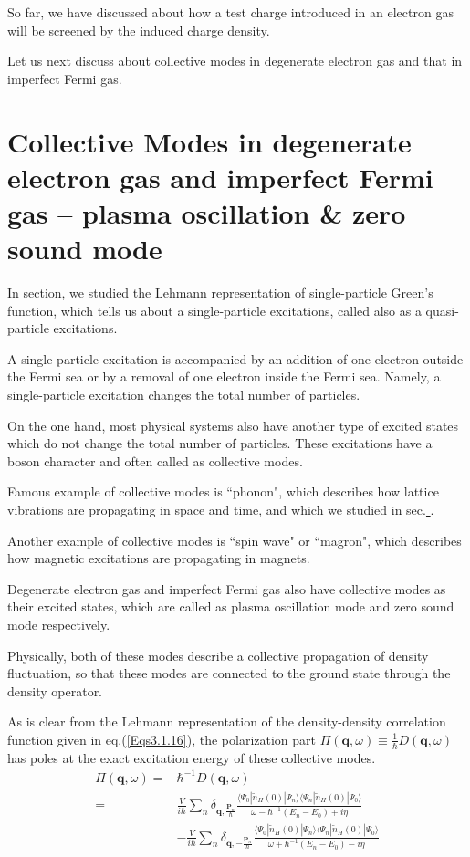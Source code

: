 So far, we have discussed about how a test charge introduced in an electron gas will be screened by the induced charge density.

Let us next discuss about collective modes in degenerate electron gas and that in imperfect Fermi gas.

\section{Collective Modes in degenerate electron gas and imperfect Fermi gas -- plasma oscillation \& zero sound mode}

In section, we studied the Lehmann representation of single-particle Green's function, which tells us about a single-particle excitations, called also as a quasi-particle excitations.

A single-particle excitation is accompanied by an addition of one electron outside the Fermi sea or by a removal of one electron inside the Fermi sea. Namely, a single-particle excitation changes the total number of particles.

On the one hand, most physical systems also have another type of excited states which do not change the total number of particles. These excitations have a boson character and often called as collective modes.

Famous example of collective modes is ``phonon", which describes how lattice vibrations are propagating in space and time, and which we studied in sec.\underline{    }.

Another example of collective modes is ``spin wave" or ``magron", which describes how magnetic excitations are propagating in magnets.

Degenerate electron gas and imperfect Fermi gas also have collective modes as their excited states, which are called as plasma oscillation mode and zero sound mode respectively.

Physically, both of these modes describe a collective propagation of density fluctuation, so that these modes are connected to the ground state through the density operator.

As is clear from the Lehmann representation of the density-density correlation function given in eq.(\ref{Eqs3.1.16}), the polarization part $\Pi(\mathbf{q},\omega) \equiv \frac{1}{\hbar}D(\mathbf{q},\omega)$ has poles at the exact excitation energy of these collective modes.
\begin{equation*} \tag{3.1.16'} \begin{split}
\Pi(\mathbf{q},\omega)=& \hbar^{-1} D(\mathbf{q},\omega)\\
=& \frac{V}{i \hbar} \sum_n \delta_{\mathbf{q},\frac{\mathbf{P}_n}{\hbar}}\frac{\langle \Psi_0 | \tilde{n}_H(0) | \Psi_n \rangle \langle \Psi_n | \tilde{n}_H(0) | \Psi_0 \rangle}{ \omega - \hbar^{-1}(E_n-E_0) + i \eta}\\
& -\frac{V}{i \hbar} \sum_n \delta_{\mathbf{q},-\frac{\mathbf{P}_n}{\hbar}}\frac{\langle \Psi_0 | \tilde{n}_H(0) | \Psi_n \rangle \langle \Psi_n | \tilde{n}_H(0) | \Psi_0 \rangle}{ \omega + \hbar^{-1}(E_n-E_0) - i \eta}
\end{split} \end{equation*}

